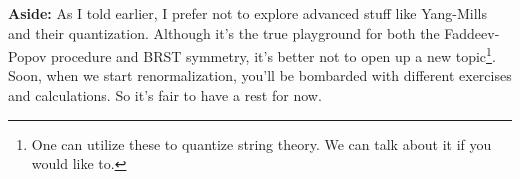 \documentclass[11pt]{article}
\begin{document}
\textbf{Aside:} As I told earlier, I prefer not to explore advanced stuff like Yang-Mills and their quantization. Although it's the true playground for both the Faddeev-Popov procedure and BRST symmetry, it's better not to open up a new topic\footnote{One can utilize these to quantize string theory. We can talk about it if you would like to.}. Soon, when we start renormalization, you'll be bombarded with different exercises and calculations. So it's fair to have a rest for now.
\end{document}
